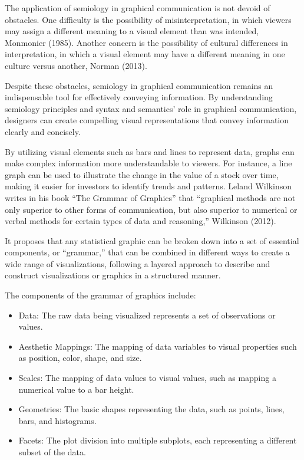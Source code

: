 \documentclass[print]{nuthesis}
\begin{document}
The application of semiology in graphical communication is not devoid of obstacles.
One difficulty is the possibility of misinterpretation, in which viewers may assign a different meaning to a visual element than was intended, Monmonier (1985).
Another concern is the possibility of cultural differences in interpretation, in which a visual element may have a different meaning in one culture versus another, Norman (2013).

Despite these obstacles, semiology in graphical communication remains an indispensable tool for effectively conveying information.
By understanding semiology principles and syntax and semantics' role in graphical communication, designers can create compelling visual representations that convey information clearly and concisely.

By utilizing visual elements such as bars and lines to represent data, graphs can make complex information more understandable to viewers.
For instance, a line graph can be used to illustrate the change in the value of a stock over time, making it easier for investors to identify trends and patterns. Leland Wilkinson writes in his book ``The Grammar of Graphics'' that ``graphical methods are not only superior to other forms of communication, but also superior to numerical or verbal methods for certain types of data and reasoning,'' Wilkinson (2012).

It proposes that any statistical graphic can be broken down into a set of essential components, or ``grammar,'' that can be combined in different ways to create a wide range of visualizations, following a layered approach to describe and construct visualizations or graphics in a structured manner.

The components of the grammar of graphics include:

\begin{itemize}
\item
  Data: The raw data being visualized represents a set of observations or values.
\item
  Aesthetic Mappings: The mapping of data variables to visual properties such as position, color, shape, and size.
\item
  Scales: The mapping of data values to visual values, such as mapping a numerical value to a bar height.
\item
  Geometries: The basic shapes representing the data, such as points, lines, bars, and histograms.
\item
  Facets: The plot division into multiple subplots, each representing a different subset of the data.
\end{itemize}
\end{document}
